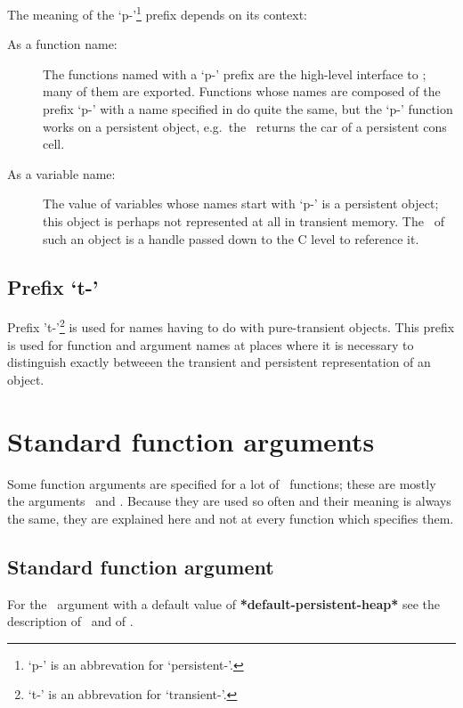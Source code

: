 The meaning of the `p-'\footnote{`p-' is an abbrevation for
  `persistent-'.} prefix depends on its context:
\begin{description}
\item[As a function name:] The functions named with a `p-' prefix are
  the high-level interface to \plob; many of them are exported.
  Functions whose names are composed of the prefix `p-' with a name
  specified in \cite{bib:CLtLII} do quite the same, but the `p-'
  function works on a persistent object, e.g.\ the \ 
  returns the car of a persistent cons cell.
\item[As a variable name:] The value of variables whose names start
  with `p-' is a persistent object; this object is perhaps not
  represented at all in transient memory. The \objid\ of such an
  object is a handle passed down to the C level to reference it.
\end{description}

\subsection{Prefix `t-'}

Prefix 't-'\footnote{`t-' is an abbrevation for `transient-'.} is used
for names having to do with pure-transient objects. This prefix is
used for function and argument names at places where it is necessary
to distinguish exactly betweeen the transient and persistent
representation of an object.

\section{Standard function arguments}

Some function arguments are specified for a lot of \plob\ functions;
these are mostly the {\opt} arguments \funarg{p-heap}\ and
. Because they are used so often and their meaning is
always the same, they are explained here and not at every function
which specifies them.

\subsection[Function argument p-heap]%
{Standard function argument \protect{}}

For the {\opt} \ argument with a default value of {\bf
  *default-persistent-heap*} see the description of
\ and of .

